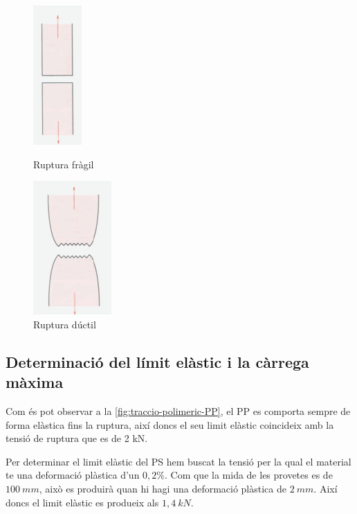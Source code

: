 \documentclass[a4paper]{report}
\begin{document}
\begin{figure}[H]
	\centering
	\begin{minipage}{0.49\textwidth}
		\centering
		\includegraphics[height=0.5\textwidth]{images/traccio/polimeric-fragil}
		\caption{Ruptura fràgil}
		\label{fig:traccio-polimeric-fragil}
	\end{minipage}
	\begin{minipage}{0.49\textwidth}
		\centering
		\includegraphics[height=0.5\textwidth]{images/traccio/polimeric-ductil}
		\caption{Ruptura dúctil}
		\label{fig:traccio-polimeric-ductil}
	\end{minipage}
\end{figure}

\subsection{Determinació del límit elàstic i la càrrega màxima}

Com és pot observar a la \autoref{fig:traccio-polimeric-PP}, el PP es comporta sempre de forma elàstica fins la ruptura, així doncs el seu limit elàstic coincideix amb la tensió de ruptura que es de 2 kN.

Per determinar el limit elàstic del PS hem buscat la tensió per la qual el material te una deformació plàstica d’un $0,2 \%$. Com que la mida de les provetes es de $100\ mm$, això es produirà quan hi hagi una deformació plàstica de $2\ mm$. Així doncs el limit elàstic es produeix als $1,4\ kN$. 
\end{document}
